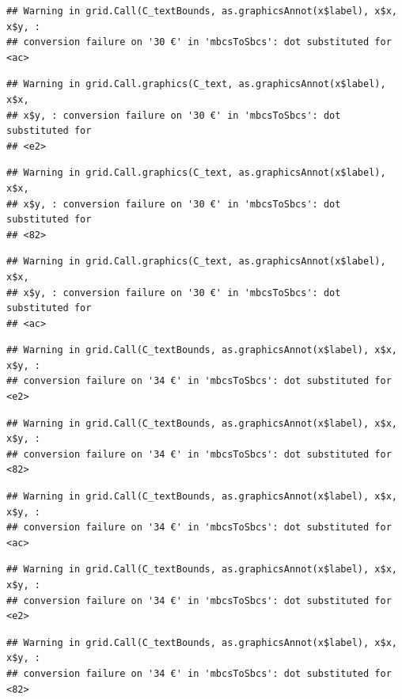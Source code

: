 \documentclass[]{gitbook}
\begin{document}
\begin{verbatim}
## Warning in grid.Call(C_textBounds, as.graphicsAnnot(x$label), x$x, x$y, :
## conversion failure on '30 €' in 'mbcsToSbcs': dot substituted for <ac>
\end{verbatim}

\begin{verbatim}
## Warning in grid.Call.graphics(C_text, as.graphicsAnnot(x$label), x$x,
## x$y, : conversion failure on '30 €' in 'mbcsToSbcs': dot substituted for
## <e2>
\end{verbatim}

\begin{verbatim}
## Warning in grid.Call.graphics(C_text, as.graphicsAnnot(x$label), x$x,
## x$y, : conversion failure on '30 €' in 'mbcsToSbcs': dot substituted for
## <82>
\end{verbatim}

\begin{verbatim}
## Warning in grid.Call.graphics(C_text, as.graphicsAnnot(x$label), x$x,
## x$y, : conversion failure on '30 €' in 'mbcsToSbcs': dot substituted for
## <ac>
\end{verbatim}

\begin{verbatim}
## Warning in grid.Call(C_textBounds, as.graphicsAnnot(x$label), x$x, x$y, :
## conversion failure on '34 €' in 'mbcsToSbcs': dot substituted for <e2>
\end{verbatim}

\begin{verbatim}
## Warning in grid.Call(C_textBounds, as.graphicsAnnot(x$label), x$x, x$y, :
## conversion failure on '34 €' in 'mbcsToSbcs': dot substituted for <82>
\end{verbatim}

\begin{verbatim}
## Warning in grid.Call(C_textBounds, as.graphicsAnnot(x$label), x$x, x$y, :
## conversion failure on '34 €' in 'mbcsToSbcs': dot substituted for <ac>
\end{verbatim}

\begin{verbatim}
## Warning in grid.Call(C_textBounds, as.graphicsAnnot(x$label), x$x, x$y, :
## conversion failure on '34 €' in 'mbcsToSbcs': dot substituted for <e2>
\end{verbatim}

\begin{verbatim}
## Warning in grid.Call(C_textBounds, as.graphicsAnnot(x$label), x$x, x$y, :
## conversion failure on '34 €' in 'mbcsToSbcs': dot substituted for <82>
\end{verbatim}
\end{document}
